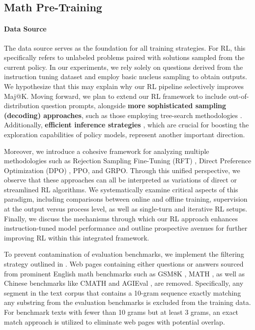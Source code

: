 \begin{itemize}[topsep=0pt]
\begin{itemize}[topsep=0pt]
\section{Math Pre-Training}

\paragraph{Data Source} The data source serves as the foundation for all training strategies. For RL, this specifically refers to unlabeled problems paired with solutions sampled from the current policy. In our experiments, we rely solely on questions derived from the instruction tuning dataset and employ basic nucleus sampling to obtain outputs. We hypothesize that this may explain why our RL pipeline selectively improves Maj@K. Moving forward, we plan to extend our RL framework to include out-of-distribution question prompts, alongside \textbf{more sophisticated sampling (decoding) approaches}, such as those employing tree-search methodologies \citep{yao2023tree}. Additionally, \textbf{efficient inference strategies} \citep{xia-etal-2023-speculative,leviathan2023fast,kwon2023efficient,xia2024unlocking}, which are crucial for boosting the exploration capabilities of policy models, represent another important direction.

Moreover, we introduce a cohesive framework for analyzing multiple methodologies such as Rejection Sampling Fine-Tuning (RFT) \citep{yuan2023scaling}, Direct Preference Optimization (DPO) \citep{dpo}, PPO, and GRPO. Through this unified perspective, we observe that these approaches can all be interpreted as variations of direct or streamlined RL algorithms. We systematically examine critical aspects of this paradigm, including comparisons between online and offline training, supervision at the output versus process level, as well as single-turn and iterative RL setups. Finally, we discuss the mechanisms through which our RL approach enhances instruction-tuned model performance and outline prospective avenues for further improving RL within this integrated framework.

To prevent contamination of evaluation benchmarks, we implement the filtering strategy outlined in \cite{deepseek-coder}. Web pages containing either questions or answers sourced from prominent English math benchmarks such as GSM8K \citep{gsm8k}, MATH \citep{MATH}, as well as Chinese benchmarks like CMATH \citep{wei2023cmath} and AGIEval \citep{agieval}, are removed. Specifically, any segment in the text corpus that contains a 10-gram sequence exactly matching any substring from the evaluation benchmarks is excluded from the training data. For benchmark texts with fewer than 10 grams but at least 3 grams, an exact match approach is utilized to eliminate web pages with potential overlap.


\end{itemize}
\end{itemize}
